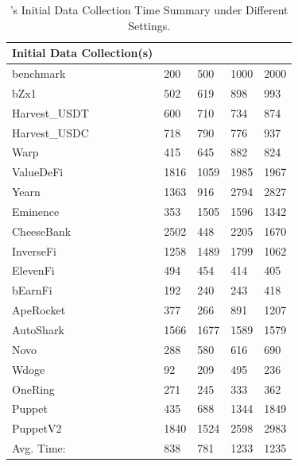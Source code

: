 \begin{table}[thbp]
    \caption{{\name}'s Initial Data Collection Time Summary under Different Settings. }
    \addtolength{\tabcolsep}{-2.5pt}
    \centering
        \begin{tabular}{|l|llll|}
            \hline
        Initial Data Collection(s) &      &      &      &      \\ \hline
        benchmark                  & 200  & 500  & 1000 & 2000 \\
        bZx1                       & 502  & 619  & 898  & 993  \\
        Harvest\_USDT              & 600  & 710  & 734  & 874  \\
        Harvest\_USDC              & 718  & 790  & 776  & 937  \\
        Warp                       & 415  & 645  & 882  & 824  \\
        ValueDeFi                  & 1816 & 1059 & 1985 & 1967 \\
        Yearn                      & 1363 & 916  & 2794 & 2827 \\
        Eminence                   & 353  & 1505 & 1596 & 1342 \\
        CheeseBank                 & 2502 & 448  & 2205 & 1670 \\
        InverseFi                  & 1258 & 1489 & 1799 & 1062 \\
        ElevenFi                   & 494  & 454  & 414  & 405  \\
        bEarnFi                    & 192  & 240  & 243  & 418  \\
        ApeRocket                  & 377  & 266  & 891  & 1207 \\
        AutoShark                  & 1566 & 1677 & 1589 & 1579 \\
        Novo                       & 288  & 580  & 616  & 690  \\
        Wdoge                      & 92   & 209  & 495  & 236  \\
        OneRing                    & 271  & 245  & 333  & 362  \\
        Puppet                     & 435  & 688  & 1344 & 1849 \\
        PuppetV2                   & 1840 & 1524 & 2598 & 2983 \\ \hline
        Avg. Time:                 & 838  & 781  & 1233 & 1235 \\ \hline
            
    \end{tabular}

\label{tab:SupIC}
\end{table}
